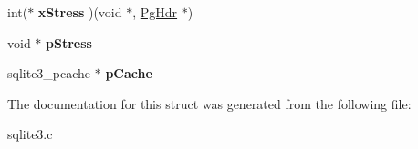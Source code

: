 \begin{DoxyCompactItemize}
\item 
int($\ast$ {\bfseries x\+Stress} )(void $\ast$, \hyperlink{structPgHdr}{Pg\+Hdr} $\ast$)\hypertarget{structPCache_a51b67ce6c17cbd7124c50d8a2d0fed50}{}\label{structPCache_a51b67ce6c17cbd7124c50d8a2d0fed50}

\item 
void $\ast$ {\bfseries p\+Stress}\hypertarget{structPCache_af04a2ea8a2c6d6b3eea7bb7051b8f447}{}\label{structPCache_af04a2ea8a2c6d6b3eea7bb7051b8f447}

\item 
sqlite3\+\_\+pcache $\ast$ {\bfseries p\+Cache}\hypertarget{structPCache_ad0248655d30d327e0eeced6c3651b161}{}\label{structPCache_ad0248655d30d327e0eeced6c3651b161}

\end{DoxyCompactItemize}


The documentation for this struct was generated from the following file\+:\begin{DoxyCompactItemize}
\item 
sqlite3.\+c\end{DoxyCompactItemize}

